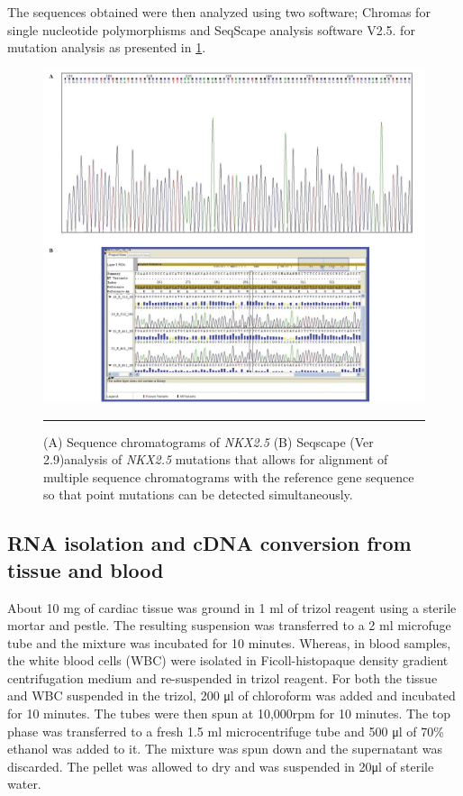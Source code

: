 \begin{refsection}
The sequences obtained were then analyzed using two software; Chromas for single nucleotide polymorphisms and SeqScape analysis software V2.5. for mutation analysis as presented in \cref{fig:2_8chromatogram}. 

\begin{figure}[!tb]
\centering
\includegraphics[width=\linewidth]{Figures/2_8chromatogram.pdf} 
\rule{35em}{0.5pt}
\caption{(A) Sequence chromatograms of \textit{NKX2.5} (B) Seqscape (Ver 2.9)analysis of \textit{NKX2.5} mutations  that allows for alignment of multiple sequence chromatograms  with the reference gene sequence so that point mutations can be detected simultaneously.}
\label{fig:2_8chromatogram}
\end{figure}

\subsection{RNA isolation and cDNA conversion from tissue and blood} 
About 10 mg of cardiac tissue was ground in 1 ml of trizol reagent using a sterile mortar and pestle. The resulting suspension was transferred to a 2 ml microfuge tube and the mixture was incubated for 10 minutes. Whereas, in blood samples, the white blood cells (WBC) were isolated in Ficoll-histopaque density gradient centrifugation medium  and  re-suspended in trizol reagent. For both the tissue and WBC suspended in the trizol, 200 μl of chloroform was added and incubated for 10 minutes. The tubes were then spun at 10,000rpm for 10 minutes. The top phase was transferred to a fresh 1.5 ml microcentrifuge tube and 500 μl of 70\% ethanol was added to it. The mixture was spun down and the supernatant was discarded. The pellet was allowed to dry and was suspended in 20μl of sterile water. 


\end{refsection}
